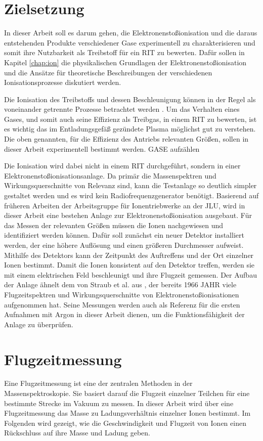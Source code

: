 \section{Zielsetzung}
In dieser Arbeit soll es darum gehen, die Elektronenstoßionisation und die daraus entstehenden Produkte verschiedener Gase experimentell zu charakterisieren und somit ihre Nutzbarkeit als Treibstoff für ein RIT zu bewerten. Dafür sollen in Kapitel \ref{chap:ion} die physikalischen Grundlagen der Elektronenstoßionisation und die Ansätze für theoretische Beschreibungen der verschiedenen Ionisationsprozesse diskutiert werden.

Die Ionisation des Treibstoffs und dessen Beschleunigung können in der Regel als voneinander getrennte Prozesse betrachtet werden \cite{ion}. Um das Verhalten eines Gases, und somit auch seine Effizienz als Treibgas, in einem RIT zu bewerten, ist es wichtig das im Entladungsgefäß gezündete Plasma möglichst gut zu verstehen. Die oben genannten, für die Effizienz des Antriebs relevanten Größen, sollen in dieser Arbeit experimentell bestimmt werden. GASE aufzählen

Die Ionisation wird dabei nicht in einem RIT durchgeführt, sondern in einer Elektronenstoßionisationsanlage. Da primär die Massenspektren und Wirkungsquerschnitte von Relevanz sind, kann die Testanlage so deutlich simpler gestaltet werden und es wird kein Radiofrequenzgenerator benötigt. Basierend auf früheren Arbeiten der Arbeitsgruppe für Ionentriebwerke an der JLU, wird in dieser Arbeit eine bestehen Anlage zur Elektronenstoßionisation ausgebaut. Für das Messen der relevanten Größen müssen die Ionen nachgewiesen und identifiziert werden können. Dafür soll zunächst ein neuer Detektor installiert werden, der eine höhere Auflösung und einen größeren Durchmesser aufweist. Mithilfe des Detektors kann der Zeitpunkt des Auftreffens und der Ort einzelner Ionen bestimmt. Damit die Ionen konsistent auf den Detektor treffen, werden sie mit einem elektrischen Feld beschleunigt und ihre Flugzeit gemessen. Der Aufbau der Anlage ähnelt dem von Straub et al. aus \cite{Straub}, der bereits 1966 JAHR viele Flugzeitspektren und Wirkungsquerschnitte von Elektronenstoßionisationen aufgenommen hat. Seine Messungen werden auch als Referenz für die ersten Aufnahmen mit Argon in dieser Arbeit dienen, um die Funktionsfähigkeit der Anlage zu überprüfen.

\section{Flugzeitmessung} 
Eine Flugzeitmessung ist eine der zentralen Methoden in der Massenspektroskopie. Sie basiert darauf die Flugzeit einzelner Teilchen für eine bestimmte Strecke im Vakuum zu messen. In dieser Arbeit wird über eine Flugzeitmessung das Masse zu Ladungsverhältnis einzelner Ionen bestimmt. Im Folgenden wird gezeigt, wie die Geschwindigkeit und Flugzeit von Ionen einen Rückschluss auf ihre Masse und Ladung geben.

